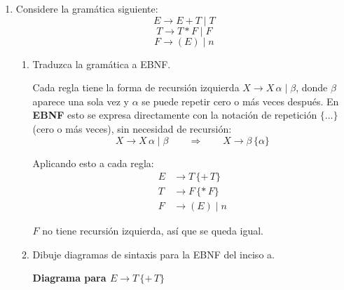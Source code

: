\documentclass[12pt,letterpaper]{article}
\begin{document}
\begin{enumerate}[label=\arabic*.]
\item Considere la gramática siguiente:
  \[
  E \to E + T \mid T
  \]
  \[
  T \to T * F \mid F
  \]
  \[
  F \to (E) \mid n
  \]

  \begin{enumerate}[label=\alph*.]

  \item Traduzca la gramática a EBNF.

    \bigskip
    
    Cada regla tiene la forma de recursión izquierda $X \to X\,\alpha \mid \beta$, donde $\beta$ aparece una
    sola vez y $\alpha$ se puede repetir cero o más veces después. En \textbf{EBNF} esto se expresa directamente
    con la notación de repetición $\{\ldots\}$ (cero o más veces), sin necesidad de recursión:
    \[
    X \to X\,\alpha \mid \beta \qquad \Longrightarrow \qquad X \to \beta\,\{\alpha\}
    \]

    Aplicando esto a cada regla:
    \[
    \begin{aligned}
      E &\to T\,\{+\,T\} \\
      T &\to F\,\{*\,F\} \\
      F &\to (E) \mid n
    \end{aligned}
    \]

    $F$ no tiene recursión izquierda, así que se queda igual.

    \bigskip
    
  \item Dibuje diagramas de sintaxis para la EBNF del inciso a.
    
    \bigskip
    
    \textbf{Diagrama para $E \to T\,\{+\,T\}$}
    \begin{center}
\end{center}
\end{enumerate}
\end{enumerate}
\end{document}
